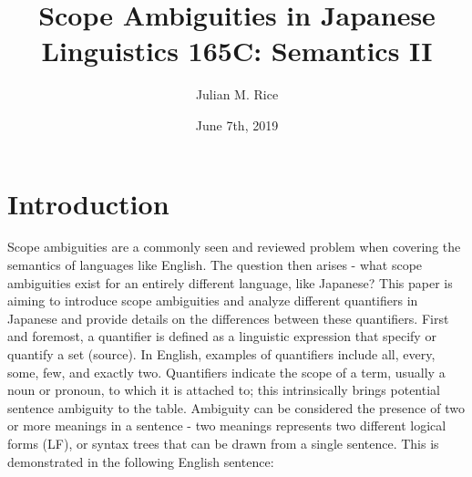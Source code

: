 \documentclass[english, 11pt]{article}
\begin{document}
\rfoot{\thepage}  %
\cfoot{}
\title{Scope Ambiguities in Japanese\\
  \large Linguistics 165C: Semantics II
}	%
\author{Julian M. Rice}
\date{June 7th, 2019}
\maketitle

\section{Introduction}
Scope ambiguities are a commonly seen and reviewed problem when covering the semantics of languages like English. The question then arises - what scope ambiguities exist for an entirely different language, like Japanese? This paper is aiming to introduce scope ambiguities and analyze different quantifiers in Japanese and provide details on the differences between these quantifiers. First and foremost, a quantifier is defined as a linguistic expression that specify or quantify a set (source). In English, examples of quantifiers include all, every, some, few, and exactly two. Quantifiers indicate the scope of a term, usually a noun or pronoun, to which it is attached to; this intrinsically brings potential sentence ambiguity to the table. Ambiguity can be considered the presence of two or more meanings in a sentence - two meanings represents two different logical forms (LF), or syntax trees that can be drawn from a single sentence. This is demonstrated in the following English sentence:
\end{document}
